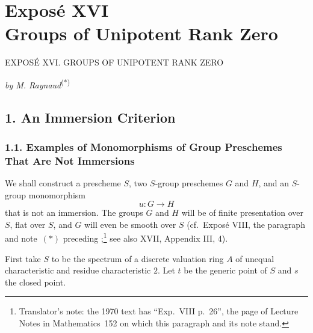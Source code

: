 
\chapter*{Exposé XVI\\
Groups of Unipotent Rank Zero}
  {EXPOSÉ XVI. GROUPS OF UNIPOTENT RANK ZERO}

\begin{center}
  \textit{by M. Raynaud}\textsuperscript{(*)}
\end{center}
\begingroup
\renewcommand{\thefootnote}{0}
\renewcommand{\thefootnote}{*}
\endgroup

\section*{1. An Immersion Criterion}

%
\subsection*{1.1. Examples of Monomorphisms of Group Preschemes
That Are Not Immersions}

We shall construct a prescheme \(S\), two \(S\)-group preschemes
\(G\) and \(H\), and an \(S\)-group monomorphism
\[
  u:G\longrightarrow H
\]
that is not an immersion. The groups \(G\) and \(H\) will be of finite
presentation over \(S\), flat over \(S\), and \(G\) will even be
smooth over \(S\) (cf.\ Exposé VIII, the paragraph and note~\((*)\)
preceding ;\footnote{Translator's note: the 1970 text has
``Exp.~VIII p.~26'', the page of Lecture Notes in Mathematics~152 on which this paragraph and its
note stand.} see also XVII, Appendix III, 4).

First take \(S\) to be the spectrum of a discrete valuation ring
\(A\) of unequal characteristic and residue characteristic \(2\).
Let \(t\) be the generic point of \(S\) and \(s\) the closed point.


